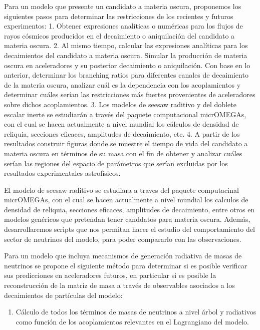 \begin{ideas}
  \newpage{}
Para un modelo que presente un candidato a materia oscura, proponemos los siguientes pasos para determinar las restricciones de los recientes y futuros experimentos:
1. Obtener expresiones analíticas o numéricas para los flujos de rayos cósmicos producidos en el decaimiento o aniquilación del candidato a materia oscura.
2. Al mismo tiempo, calcular las expresiones analíticas para los decaimientos del candidato a materia oscura. Simular la producción de materia oscura en aceleradores  y su posterior decaimiento o aniquilación. Con base en lo anterior, determinar los branching ratios para diferentes canales de decaimiento de la materia oscura, analizar cuál es la dependencia con los acoplamientos y determinar cuáles serían las restricciones más fuertes provenientes de aceleradores sobre dichos acoplamientos. 
3. Los modelos de seesaw raditivo y del doblete escalar inerte se estudiarán a través del paquete computacional micrOMEGAs, con el cual se hacen actualmente a nivel mundial los cálculos de densidad de reliquia, secciones eficaces, amplitudes de decaimiento, etc.
4. A partir de los resultados construir figuras donde se muestre el tiempo de vida del candidato a materia oscura en términos de su masa con el fin de obtener y analizar cuáles serían las regiones del espacio de parámetros que serían excluidas por los resultados experimentales astrofísicos. 

El modelo de seesaw raditivo se estudiara a traves del paquete computacinal micrOMEGAs, con el cual se hacen actualmente a nivel mundial los calculos de densidad de reliquia, secciones eficaces, amplitudes de decaimiento, entre otros en modelos genéricos que pretendan tener canddatos para materia oscura. Además, desarrollaremos scripts que nos permitan hacer el estudio del comportamiento del sector de neutrinos del modelo, para poder compararlo con las observaciones.

Para un modelo que incluya mecanismos de generación radiativa de masas
de neutrinos se propone el siguiente método para determinar si es
posible verificar sus predicciones en aceleradores futuros, en
particular si es posible la reconstrucción de la matriz de masa a
través de observables asociados a los decaimientos de partículas del
modelo:
\begin{enumerate}
\item Cálculo de todos los términos de masas de neutrinos a nivel
  árbol y radiativos como función de los acoplamientos relevantes en
  el Lagrangiano del modelo.


\end{enumerate}
\end{ideas}
